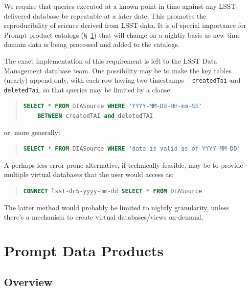 \documentclass[SE,lsstdraft,toc]{lsstdoc}
\begin{document}
We require that queries executed at a known point in time against any LSST-delivered database be repeatable at a later date. This promotes the reproducibility of science derived from LSST data. It is of special importance for Prompt product catalogs (\S~\ref{sec:level1}) that will change on a nightly basis as new time domain data is being processed and added to the catalogs.

The exact implementation of this requirement is left to the LSST Data Management database team. One possibility may be to make the key tables (nearly) append-only, with each row having two timestamps -- \texttt{createdTai} and \texttt{deletedTai}, so that queries may be limited by a  clause:
\begin{quote}
\item \begin{lstlisting}[language=SQL]
SELECT * FROM DIASource WHERE 'YYYY-MM-DD-HH-mm-SS'
    BETWEEN createdTAI and deletedTAI
\end{lstlisting}
\end{quote}
%
or, more generally:
%
\begin{quote}
\item \begin{lstlisting}[language=SQL,showstringspaces=false]
SELECT * FROM DIASource WHERE 'data is valid as of YYYY-MM-DD'
\end{lstlisting}
\end{quote}
%
A perhaps less error-prone alternative, if technically feasible, may be to provide multiple virtual databases that the user would access as:
%
\begin{quote}
\item \begin{lstlisting}[language=SQL]
CONNECT lsst-dr5-yyyy-mm-dd SELECT * FROM DIASource
\end{lstlisting}
\end{quote}
%
The latter method would probably be limited to nightly granularity, unless there's a mechanism to create virtual databases/views on-demand.


\clearpage

\section{Prompt Data Products}
\label{sec:level1}

\subsection{Overview}
\end{document}
